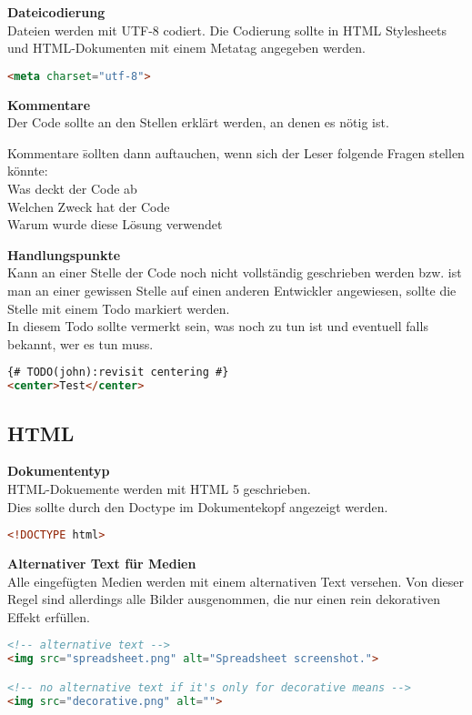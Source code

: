 \textbf{Dateicodierung}\\
Dateien werden mit UTF-8 codiert.
Die Codierung sollte in HTML Stylesheets und HTML-Dokumenten mit einem Metatag angegeben werden.\\
\begin{lstlisting}[language = HTML, caption = Metatag für die UTF-8 Codierung, label = utf-8]
<meta charset="utf-8">
\end{lstlisting}

\textbf{Kommentare}\\
Der Code sollte an den Stellen erklärt werden, an denen es nötig ist.\\
\begin{tabbing}
Kommentare \= sollten dann auftauchen, wenn sich der Leser folgende Fragen stellen könnte:\\
\> Was deckt der Code ab\\
\> Welchen Zweck hat der Code\\
\> Warum wurde diese Lösung verwendet
\end{tabbing}

\textbf{Handlungspunkte}\\
Kann an einer Stelle der Code noch nicht vollständig geschrieben werden bzw. ist man an einer gewissen Stelle auf einen anderen Entwickler angewiesen, sollte die Stelle mit einem Todo markiert werden.\\
In diesem Todo sollte vermerkt sein, was noch zu tun ist und eventuell falls bekannt, wer es tun muss.\\
\begin{lstlisting}[language = HTML, caption = Kennzeichnung eines Handlungspunktes, label = todo]
{# TODO(john):revisit centering #}
<center>Test</center>
\end{lstlisting}
\subsection{HTML}

\textbf{Dokumententyp}\\
HTML-Dokuemente werden mit HTML 5 geschrieben.\\
Dies sollte durch den Doctype im Dokumentekopf angezeigt werden.
\begin{lstlisting}[language = HTML, caption = Kennzeichnung des Dokumententyps, label = doctype]
<!DOCTYPE html>
\end{lstlisting}

\textbf{Alternativer Text für Medien}\\
Alle eingefügten Medien werden mit einem alternativen Text versehen. Von dieser Regel sind allerdings alle Bilder ausgenommen, die nur einen rein dekorativen Effekt erfüllen.
\begin{lstlisting}[language = HTML, caption = Alternativtext, label = alttext]
<!-- alternative text -->
<img src="spreadsheet.png" alt="Spreadsheet screenshot.">

<!-- no alternative text if it's only for decorative means -->
<img src="decorative.png" alt="">
\end{lstlisting}


